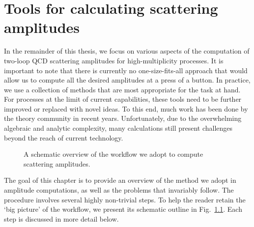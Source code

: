 \documentclass[main.tex]{subfiles}
\begin{document}
\chapter{Tools for calculating scattering amplitudes}
In the remainder of this thesis, we focus on various aspects of the computation of two-loop QCD scattering amplitudes for high-multiplicity processes. It is important to note that there is currently no one-size-fits-all approach that would allow us to compute all the desired amplitudes at a press of a button. In practice, we use a collection of methods that are most appropriate for the task at hand. For processes at the limit of current capabilities, these tools need to be further improved or replaced with novel ideas. To this end, much work has been done by the theory community in recent years. Unfortunately, due to the overwhelming algebraic and analytic complexity, many calculations still present challenges beyond the reach of current technology. 
\begin{figure}[t]
\caption{A schematic overview of the workflow we adopt to compute scattering amplitudes.}
\label{fig:outline}
\end{figure}
The goal of this chapter is to provide an overview of the method we adopt in amplitude computations, as well as the problems that invariably follow. The procedure involves several highly non-trivial steps. To help the reader retain the `big picture' of the workflow, we present its schematic outline in Fig.~\ref{fig:outline}.  Each step is discussed in more detail below. 
\end{document}

